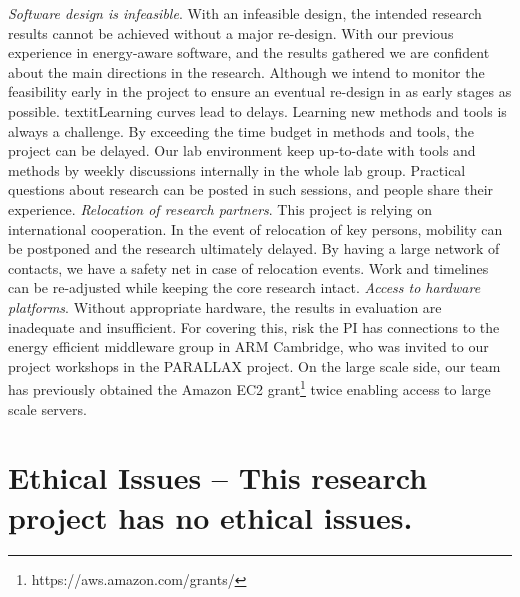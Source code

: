 \documentclass{article}
\begin{document}
  \textit{Software design is infeasible}. With an infeasible design, the intended research results cannot be achieved without a major re-design.
  With our previous experience in energy-aware software, and the results gathered we are confident about the main directions in the research. Although we intend to monitor the feasibility early in the project to ensure an eventual re-design in as early stages as possible.\smallskip
  textit{Learning curves lead to delays}. Learning new methods and tools is always a challenge. By exceeding the time budget in methods and tools, the project can be delayed.
  Our lab environment keep up-to-date with tools and methods by weekly discussions internally in the whole lab group. Practical questions about research can be posted in such sessions, and people share their experience.\smallskip
 \textit{Relocation of research partners}. This project is relying on international cooperation. In the event of relocation of key persons, mobility can be postponed and the research ultimately delayed.
 By having a large network of contacts, we have a safety net in case of relocation events. Work and timelines can be re-adjusted while keeping the core research intact.\smallskip
 \textit{Access to hardware platforms}. Without appropriate hardware, the results in evaluation are inadequate and insufficient.
 For covering this, risk the PI has connections to the energy efficient middleware group in ARM Cambridge, who was invited to our project workshops in the PARALLAX project.
 On the large scale side, our team has previously obtained the Amazon EC2 grant\footnote{https://aws.amazon.com/grants/} twice enabling access to large scale servers.


\section{Ethical Issues \small -- This research project has no ethical issues. }
\end{document}
